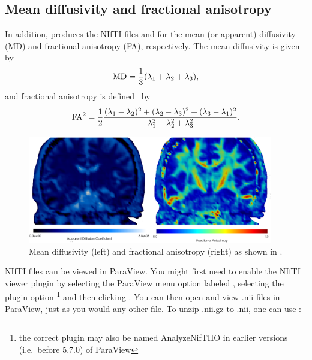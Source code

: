 \subsection{Mean diffusivity and fractional anisotropy}
In addition,  produces the NIfTI files
 and  for the mean (or apparent)
diffusivity (MD) and fractional anisotropy (FA), respectively. 
The mean diffusivity is given by 
\begin{equation}\label{eqn:chp5:md}
  \rm{MD} = \frac{1}{3}(\lambda_1 + \lambda_2 + \lambda_3),   
\end{equation}
and  fractional
anisotropy is defined~\cite{kindlmann2007geodesic} by
\begin{equation}\label{eqn:chp5:fa}
	\rm{FA}^2 = \frac{1}{2} \frac{(\lambda_1-\lambda_2)^2 
+ (\lambda_2 - \lambda_3)^2 + (\lambda_3 - \lambda_1)^2}{\lambda_1^2 
+ \lambda_2^2 + \lambda_3^2} .  
\end{equation}
\begin{figure}	
  \begin{center}
    \includegraphics[width=0.95\textwidth]{./graphics/chp5/paraview_adcfa.png}
  \end{center}
  \caption{Mean diffusivity (left) and fractional anisotropy (right) as shown in .}
  \label{fig:chp5:DTIfa}
\end{figure}
NIfTI files can be viewed in ParaView. You might first need to enable
the NIfTI viewer plugin by selecting the ParaView menu option labeled
, selecting the plugin option%
\footnote{the correct plugin may also be named AnalyzeNifTIIO in earlier 
versions (i.e.~before 5.7.0) of ParaView} 
 and then clicking . You
can then open and view .nii files in ParaView, just as you would any other
file. To unzip .nii.gz to .nii, one can use :

